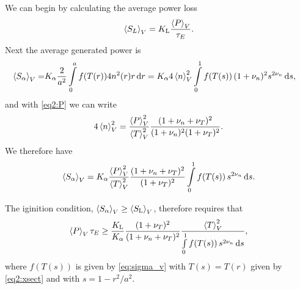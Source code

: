\documentclass[11pt,a4paper, 
swedish, english %
]{article}
\begin{document}
We can begin by calculating the average power loss
\begin{equation}
\ev{S_L}_V =K_\text{L} \frac{\ev{P}_V}{\tau_E}.
\end{equation}
Next the average generated power is
\begin{equation}
\begin{aligned}
\ev{S_\alpha}_V =& K_\alpha\frac{2}{a^2}
\int_0^a f(T(r)) 4n^2(r)r\id{r}
=K_\alpha4\ev{n}_V^2
\int_0^1 f(T(s))\,(1+\nu_n)^2s^{2\nu_n}\id{s},
\end{aligned}
\end{equation}
and with \eqref{eq2:P} we can write
\begin{equation}
4\ev{n}_V^2=\frac{\ev{P}_V^2}{\ev{T}_V^2}
\frac{(1+\nu_n+\nu_T)^2}{(1+\nu_n)^2(1+\nu_T)^2}.
\end{equation}
We therefore have
\begin{equation}
\ev{S_\alpha}_V =K_\alpha\frac{\ev{P}_V^2}{\ev{T}_V^2}
\frac{(1+\nu_n+\nu_T)^2}{(1+\nu_T)^2}
\int_0^1 f(T(s))\,s^{2\nu_n}\id{s}.
\end{equation}

The iginition condition, $\ev{S_\alpha}_V\ge\ev{S_\text{L}}_V$,
therefore requires that 
\begin{equation}
\ev{P}_V\tau_E \ge
\frac{K_\text{L}}{K_\alpha}
\frac{(1+\nu_T)^2}{(1+\nu_n+\nu_T)^2}
\frac{\ev{T}_V^2}{\int_0^1 f(T(s))\,s^{2\nu_n}\id{s}},
\end{equation}
where $f(T(s))$ is given by \eqref{eq:sigma_v} with $T(s)=T(r)$ given
by \eqref{eq2:xsect} and with $s=1-r^2/a^2$.



\end{document}
